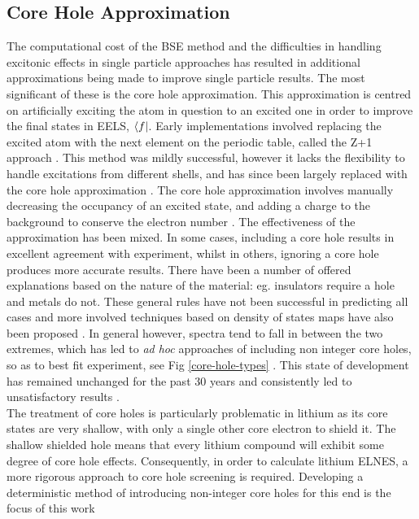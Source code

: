 \subsection{Core Hole Approximation} \label{Core Hole Approximation}
The computational cost of the BSE method and the difficulties in handling excitonic effects in  single particle approaches has resulted in additional approximations being made to improve single particle results.  The most significant of these is the core hole approximation.  This approximation is centred on artificially exciting the atom in question to an excited one in order to improve the final states in EELS, $\bra{f}$.  Early implementations involved replacing the excited atom with the next element on the periodic table, called the Z+1 approach \cite{lee_new_1977}.  This method was mildly successful, however it lacks the flexibility to handle excitations from different shells, and has since been largely replaced with the core hole approximation \cite{hebert_practical_2007}.  The core hole approximation involves manually decreasing the occupancy of an excited state, and adding a charge to the background to conserve the electron number \cite{wien2k}. The effectiveness of the approximation has been mixed.  In some cases, including a core hole results in excellent agreement with experiment, whilst in others, ignoring a core hole produces more accurate results.   There have been a number of offered explanations based on the nature of the material: eg. insulators require a hole and metals do not.  These general rules have not been successful in predicting all cases and more involved techniques based on density of states maps have also been proposed \cite{mauchamp_core-hole_2009}.  In general however, spectra tend to fall in between the two extremes, which has led to \textit{ad hoc} approaches of including non integer core holes, so as to best fit experiment, see Fig \ref{core-hole-types} \cite{hebert_practical_2007, luitz_partial_2001, hebert_improvement_2003, slater_energy_1964}. This state of development has remained unchanged for the past 30 years and consistently led to unsatisfactory results \cite{ brydson_further_1988, hardcastle_robust_2017,bad_hole1,bad_hole2, bad_hole3, bad_hole4, bad_hole5, bad_hole6, bad_hole7, bad_hole8,bad_hole9, bad_hole10}. \\

The treatment of core holes is particularly problematic in lithium as its core states are very shallow, with only a single other core electron to shield it.  The shallow shielded hole means that every lithium compound will exhibit some degree of core hole effects.  Consequently, in order to  calculate lithium ELNES, a more rigorous approach to core hole screening is required.  Developing a deterministic method of introducing non-integer core holes for this end is the focus of this work


